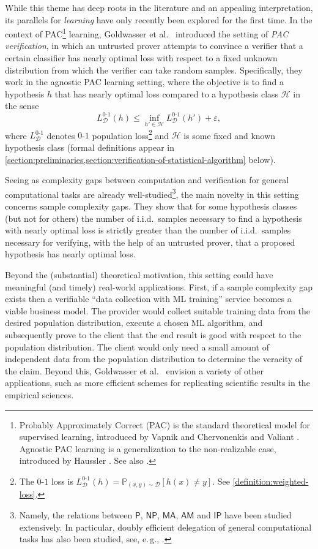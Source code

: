 \documentclass[11pt]{article}
\numberwithin{equation}{section}
\theoremstyle{definition}
\theoremstyle{plain}
\newcommand{\eg}{e.\,g.}
\theoremstyle{definition}\newtheorem{notation}[theorem]{Notation}\theoremstyle{plain}\raggedbottom
\newcommand{\roundBrackets}[1]{
	\mathopen{}\left(#1\right)\mathclose{}
}
\newcommand{\squareBrackets}[1]{
	\mathopen{}\left[#1\right]\mathclose{}
}
\newcommand{\customFunctionSquare}[2]{
	#1\squareBrackets{#2}
}
\newcommand{\PPP}[2]{\customFunctionSquare{\mathbb{P}_{#1}}{#2}}
\newcommand{\LossIndicator}[2]{\LossIndicatorNameEmpty_{#1}\roundBrackets{#2}}
\newcommand{\LossIndicatorName}[1]{\LossIndicatorNameEmpty_{#1}}
\newcommand{\LossIndicatorNameEmpty}{L^{0\text{-}1}}
\newcommand{\cD}{\mathcal{D}}
\newcommand{\cH}{\mathcal{H}}
\newcommand{\1}{\mathds{1}}
\begin{document}
While this theme has deep roots in the literature and an appealing interpretation, its parallels for \emph{learning} have only recently been explored for the first time. In the context of PAC\footnote{Probably Approximately Correct (PAC) is the standard theoretical model for supervised learning, introduced by Vapnik and Chervonenkis \cite{VapChe68} and Valiant \cite{Valiant84}. Agnostic PAC learning is a generalization to the non-realizable case, introduced by Haussler \cite{Haussler92}. See also \cite{0033642}.} learning, Goldwasser et al.\ \cite{GoldwasserRSY21} introduced the setting of \emph{PAC verification}, in which an untrusted prover attempts to convince a verifier that a certain classifier has %
%
nearly optimal %
loss with respect to a fixed unknown distribution from which the verifier can take random samples. Specifically, they work in the agnostic PAC learning setting, where the objective is to find a hypothesis $h$ that has nearly optimal loss compared to a hypothesis class $\cH$ in the sense 
\begin{equation}\label{eq:pac-learning}
	\LossIndicator{\cD}{h} \leq \inf_{h' \in \cH} \LossIndicator{\cD}{h'} + \varepsilon,
\end{equation}
where $\LossIndicatorName{\cD}$ denotes $0$-$1$ population loss\footnote{%
	The $0$-$1$ loss is $\LossIndicatorName{\cD}(h) = \PPP{(x,y) \sim \cD}{h(x) \neq y}$. See \cref{definition:weighted-loss}.%
} and $\cH$ is some fixed and known hypothesis class (formal definitions appear in \cref{section:preliminaries,section:verification-of-statistical-algorithm} below). 

Seeing as complexity gaps between computation and verification for general 
computational %
tasks %
are already well-studied\footnote{
  Namely, the relations between $\mathsf{P}$, $\mathsf{NP}$, $\mathsf{MA}$, $\mathsf{AM}$ and $\mathsf{IP}$ have been studied extensively. In particular, doubly efficient delegation of general computational tasks has also been studied,
%
see, \eg,  %
\cite{DBLP:journals/jacm/GoldwasserKR15}.
}, the main novelty in this setting concerns sample complexity gaps. They show that for some hypothesis classes (but not for others) the number of i.i.d.\ samples necessary to find a hypothesis with nearly optimal loss is strictly greater than the number of i.i.d.\ samples necessary for verifying, with the help of an untrusted prover, that a proposed hypothesis has nearly optimal loss.

Beyond the (substantial) theoretical motivation, this setting could have meaningful (and timely) real-world applications. First, if a sample complexity gap exists then a verifiable ``data collection with ML training'' service becomes a viable  business model. The provider would collect suitable training data from the desired population distribution, execute a chosen ML algorithm, and subsequently prove to the client that the end result is good with respect to the population distribution. The client would only need a small amount of independent data from the population distribution to determine the veracity of the claim. Beyond this, Goldwasser et al.\ \cite{GoldwasserRSY21} envision a variety of other applications, such as more efficient schemes for replicating scientific results in the empirical sciences.
\end{document}

